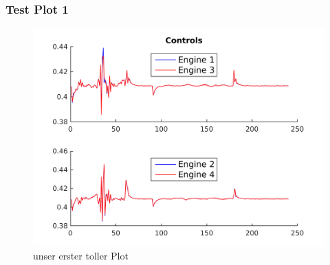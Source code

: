 \begin{frame}
	\frametitle{Test Plot 1}
	\begin{figure}%
	\includegraphics[width=0.75\columnwidth]{images/controls}%
	\caption{unser erster toller Plot}
	\end{figure}
\end{frame}